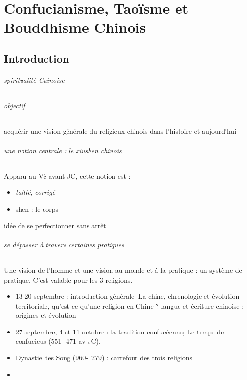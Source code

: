 \part{Confucianisme, Taoïsme et Bouddhisme Chinois}
\chapter{Introduction}


\paragraph{spiritualité Chinoise}

\paragraph{objectif } acquérir une vision générale du religieux chinois dans l'histoire et aujourd'hui


\paragraph{une notion centrale : le xiushen chinois}

\begin{Def}[xiushen]
    Apparu au Vè avant JC, cette notion est :
    \begin{itemize}
        \item \textit{taillé}, \textit{corrigé}
        \item shen : le corps
    \end{itemize}
    idée de se perfectionner sans arrêt
\end{Def}

\paragraph{se dépasser à travers certaines pratiques}
Une vision de l'homme et une vision au monde et à la pratique : un système de pratique. C'est valable pour les 3 religions. 

\begin{itemize}
    \item 13-20 septembre : introduction générale. La chine, chronologie et évolution territoriale, qu'est ce qu'une religion en Chine ? langue et écriture chinoise : origines et évolution
    \item 27 septembre, 4 et 11 octobre : la tradition confucéenne; Le temps de confucieus (551 -471 av JC). 

    \item Dynastie des Song (960-1279) : carrefour des trois religions

    \item 
\end{itemize}

